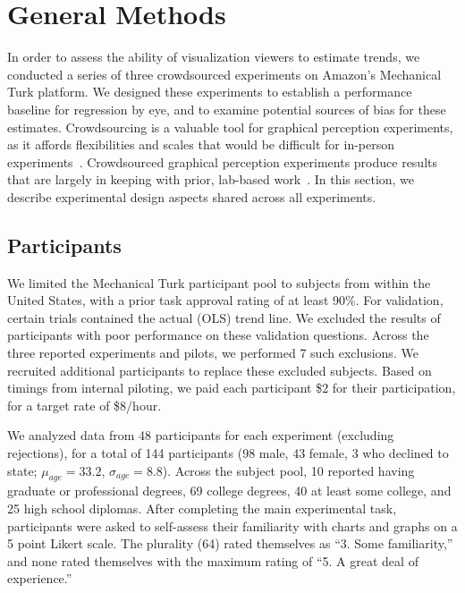 \documentclass{sigchi}
\begin{document}
\section{General Methods}

\expFig

In order to assess the ability of visualization viewers to estimate trends, we conducted a series of three crowdsourced experiments on Amazon's Mechanical Turk platform. We designed these experiments to establish a performance baseline for regression by eye, and to examine potential sources of bias for these estimates. Crowdsourcing is a valuable tool for graphical perception experiments, as it affords flexibilities and scales that would be difficult for in-person experiments~\cite{heer2010crowdsourcing}. Crowdsourced graphical perception experiments produce results that are largely in keeping with prior, lab-based work~\cite{heer2010crowdsourcing, talbot2014four}. In this section, we describe experimental design aspects shared across all experiments.

\subsection{Participants}

We limited the Mechanical Turk participant pool to subjects from within the United States, with a prior task approval rating of at least 90\%. For validation, certain trials contained the actual (OLS) trend line. We excluded the results of participants with poor performance on these validation questions. Across the three reported experiments and pilots, we performed 7 such exclusions. We recruited additional participants to replace these excluded subjects. Based on timings from internal piloting, we paid each participant \$2 for their participation, for a target rate of \$8/hour.

We analyzed data from 48 participants for each experiment (excluding rejections), for a total of 144 participants (98 male, 43 female, 3 who declined to state; $\mu_{age}= 33.2$, $\sigma_{age}=8.8$). Across the subject pool, 10 reported having graduate or professional degrees, 69 college degrees, 40 at least some college, and 25 high school diplomas. After completing the main experimental task, participants were asked to self-assess their familiarity with charts and graphs on a 5 point Likert scale. The plurality (64) rated themselves as ``3. Some familiarity,'' and none rated themselves with the maximum rating of ``5. A great deal of experience.''
\end{document}
